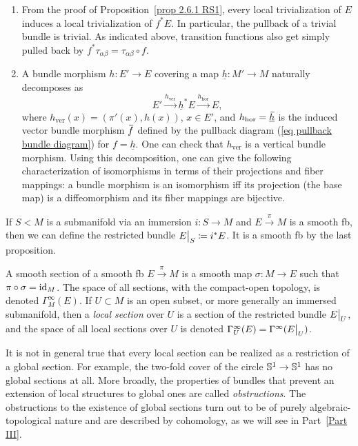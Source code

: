 \begin{rem}
\begin{enumerate}
    \item From the proof of Proposition~\ref{prop 2.6.1 RS1}, every local trivialization of $E$ induces a local trivialization of $f^\ast E$. In particular, the pullback of a trivial bundle is trivial. As indicated above, transition functions also get simply pulled back by $f^\ast \tau_{\alpha\beta}=\tau_{\alpha\beta}\circ f$.
    \item A bundle morphism $h:E'\to E$ covering a map $\underline{h}:M'\to M$ naturally decomposes as
    \[E'\overset{h_{\mathrm{ver}}}{\to} \underline{h}^\ast E\overset{h_{\mathrm{hor}}}{\to} E,\label{eq 2.6.2 RS1}\]
    where $h_{\mathrm{ver}}(x)=(\pi'(x),h(x))$, $x\in E'$, and $h_{\mathrm{hor}}=\underline{\wt{h}}$ is the induced vector bundle morphism $\wt{f}$ defined by the pullback diagram (\ref{eq pullback bundle diagram}) for $f=\underline{h}$. One can check that $h_{\mathrm{ver}}$ is a vertical bundle morphism.  Using this decomposition, one can give the following characterization of isomorphisms in terms of their projections and fiber mappings: a bundle morphism is an isomorphism iff its projection (the base map) is a diffeomorphism and its fiber mappings are bijective.
\end{enumerate}
\end{rem}


\begin{defn}
    If $S< M$ is a submanifold via an immersion $i:S\to M$ and $E\overset{\pi}{\to}M$ is a smooth \gls{fb}, then we can define the restricted bundle $\restr{E}{S}\coloneqq i^\ast E$. It is a smooth \gls{fb} by the last proposition.
\end{defn}

\begin{defn}
    A smooth section of a smooth \gls{fb} $E\overset{\pi}{\to}M$ is a smooth map $\sigma:M\to E$ such that $\pi\circ \sigma=\operatorname{id}_M$. The space of all sections, with the compact-open topology, is denoted $\Gamma^\infty_M(E)$. If $U\subset M$ is an open subset, or more generally an immersed submanifold, then a \emph{local section} over $U$ is a section of the restricted bundle $\restr{E}{U}$, and the space of all local sections over $U$ is denoted $\Gamma^\infty_U(E)=\Gamma^\infty(\restr{E}{U})$.
\end{defn}
\begin{rem}
    It is not in general true that every local section can be realized as a restriction of a global section. For example, the two-fold cover of the circle $\mathbb{S}^1\to \mathbb{S}^1$ has no global sections at all. More broadly, the properties of bundles that prevent an extension of local structures to global ones are called \emph{obstructions}. The obstructions to the existence of global sections turn out to be of purely algebraic-topological nature and are described by cohomology, as we will see in Part~\ref{Part III}.
\end{rem}


